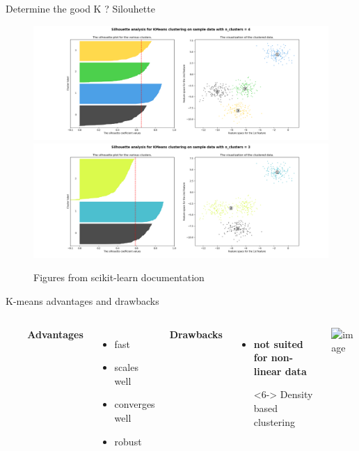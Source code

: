 \documentclass{irdbeamer}
\begin{document}
\begin{frame}{Determine the good K ? Silouhette}
    \vspace{-.5cm}
    \begin{figure}
    \centering
    \includegraphics[width=.6\textwidth]{./figs/silouhette.png}
    \includegraphics[width=.6\textwidth]{./figs/silouhette2.png}
    \caption{\tiny Figures from scikit-learn documentation}
    \end{figure}
\end{frame}

\begin{frame}{K-means advantages and drawbacks}
\begin{columns}
\begin{column}{0.01\textwidth}
\begin{itemize}
    \item[] 
    \item[] 
    \item[] 
    \item[] 
\end{itemize}
\end{column}
        \textbf{Advantages}
        \begin{itemize}
            \item<1-> fast
            \item<2-> scales well
            \item<3-> converges well
            \item<4-> robust
        \end{itemize}
        \textbf{Drawbacks}
        \begin{itemize}
            \item<5-> \textbf{not suited for non-linear data}
            \item[\rightarrow]<6-> Density based clustering 
            \item[] 
            \item[] 
        \end{itemize}
    \includegraphics<5->[height=.8\textheight]{./figs/kmeans-non-linearity.png}
\end{columns}
\end{frame}
\end{document}
